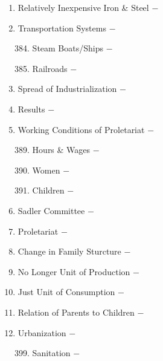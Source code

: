 \documentclass[12pt]{article}
\begin{document}
\begin{enumerate}
\item Relatively Inexpensive Iron \& Steel $-$

\item Transportation Systems $-$

\begin{enumerate}[label=\arabic{*}.]
\setcounter{enumii}{383}

\item Steam Boats/Ships $-$

\item Railroads $-$ 


\end{enumerate}
\setcounter{enumi}{385}

\item Spread of Industrialization $-$ 

\item Results $-$ 

\item Working Conditions of Proletariat $-$ 

\begin{enumerate}[label=\arabic{*}.]
\setcounter{enumii}{388}

\item Hours \& Wages $-$

\item Women $-$

\item Children $-$ 


\end{enumerate}
\setcounter{enumi}{391}

\item Sadler Committee $-$ 

\item Proletariat $-$ 

\item Change in Family Sturcture $-$ 

\item No Longer Unit of Production $-$ 

\item Just Unit of Consumption $-$ 

\item Relation of Parents to Children $-$ 

\item Urbanization $-$ 

\begin{enumerate}[label=\arabic{*}.]
\setcounter{enumii}{398}

\item Sanitation $-$


\end{enumerate}
\end{enumerate}
\end{document}
